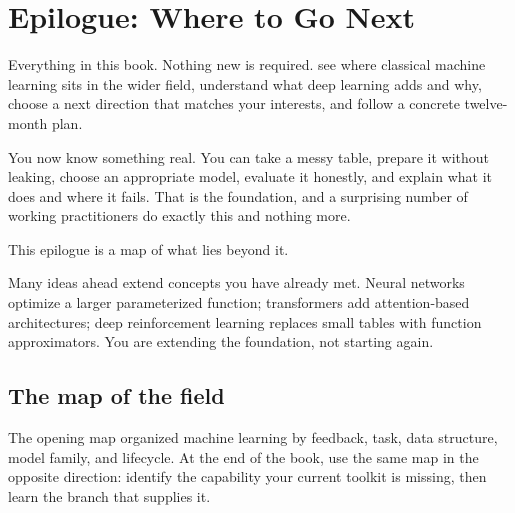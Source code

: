 \chapter*{Epilogue: Where to Go Next}
{}
\label{ch:next}
\setcounter{section}{0}
\renewcommand{\thesection}{E.\arabic{section}}
\renewcommand{\theHsection}{E.\arabic{section}}

\chapterguide%
  {Everything in this book. Nothing new is required.}
  {see where classical machine learning sits in the wider field, understand what deep learning adds and why, choose a next direction that matches your interests, and follow a concrete twelve-month plan.}

You now know something real. You can take a messy table, prepare it without leaking, choose an appropriate model, evaluate it honestly, and explain what it does and where it fails. That is the foundation, and a surprising number of working practitioners do exactly this and nothing more.

This epilogue is a map of what lies beyond it.

\begin{keyidea}
Many ideas ahead extend concepts you have already met. Neural networks optimize a larger parameterized function; transformers add attention-based architectures; deep reinforcement learning replaces small tables with function approximators. You are extending the foundation, not starting again.
\end{keyidea}

\section{The map of the field}

The opening map organized machine learning by feedback, task, data structure, model family, and lifecycle. At the end of the book, use the same map in the opposite direction: identify the capability your current toolkit is missing, then learn the branch that supplies it.

